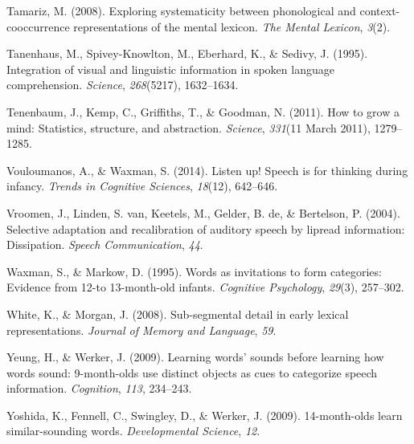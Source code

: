 \documentclass[english,man]{apa6}
\theoremstyle{definition}
\theoremstyle{definition}
\theoremstyle{definition}
\theoremstyle{remark}
\begin{document}
\hypertarget{ref-Tamariz2008}{}
Tamariz, M. (2008). Exploring systematicity between phonological and
context-cooccurrence representations of the mental lexicon. \emph{The
Mental Lexicon}, \emph{3}(2).

\hypertarget{ref-Tanenhaus1995}{}
Tanenhaus, M., Spivey-Knowlton, M., Eberhard, K., \& Sedivy, J. (1995).
Integration of visual and linguistic information in spoken language
comprehension. \emph{Science}, \emph{268}(5217), 1632--1634.

\hypertarget{ref-tenenbaum11}{}
Tenenbaum, J., Kemp, C., Griffiths, T., \& Goodman, N. (2011). How to
grow a mind: Statistics, structure, and abstraction. \emph{Science},
\emph{331}(11 March 2011), 1279--1285.

\hypertarget{ref-vouloumanos2014}{}
Vouloumanos, A., \& Waxman, S. (2014). Listen up! Speech is for thinking
during infancy. \emph{Trends in Cognitive Sciences}, \emph{18}(12),
642--646.

\hypertarget{ref-vroomen2004}{}
Vroomen, J., Linden, S. van, Keetels, M., Gelder, B. de, \& Bertelson,
P. (2004). Selective adaptation and recalibration of auditory speech by
lipread information: Dissipation. \emph{Speech Communication},
\emph{44}.

\hypertarget{ref-waxman1995}{}
Waxman, S., \& Markow, D. (1995). Words as invitations to form
categories: Evidence from 12-to 13-month-old infants. \emph{Cognitive
Psychology}, \emph{29}(3), 257--302.

\hypertarget{ref-white2008b}{}
White, K., \& Morgan, J. (2008). Sub-segmental detail in early lexical
representations. \emph{Journal of Memory and Language}, \emph{59}.

\hypertarget{ref-yeung09}{}
Yeung, H., \& Werker, J. (2009). Learning words' sounds before learning
how words sound: 9-month-olds use distinct objects as cues to categorize
speech information. \emph{Cognition}, \emph{113}, 234--243.

\hypertarget{ref-yoshida2009}{}
Yoshida, K., Fennell, C., Swingley, D., \& Werker, J. (2009).
14-month-olds learn similar-sounding words. \emph{Developmental
Science}, \emph{12}.
\end{document}
